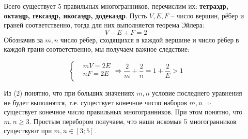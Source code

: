 \documentclass[12pt]{article}
\newcommand{\te}{\ensuremath{\Rightarrow}}
\begin{document}
Всего существует 5 правильных многогранников, перечислим их: \textbf{тетраэдр, октаэдр, гексаэдр, икосаэдр, додекаэдр}. Пусть $ V, E, F $ -- число вершин, рёбер и граней соответственно, тогда для них выполняется теорема Эйлера: 
 \begin{equation}
V - E + F = 2
 \end{equation}
Обозначив за $m,n$  число рёбер, сходящихся в каждой вершине и  число рёбер в каждой грани соответственно, мы получаем важное следствие: 

\begin{equation}
\left\{
\begin{aligned}
&mV= 2E  \\
&nF = 2E\\
\end{aligned}
\right.
\te \dfrac{2}{m} + \dfrac{2}{n} = 1 + \dfrac{2}{E} > 1
\end{equation}

Из (2) понятно, что при больших значениях $m, n$ условие последнего уравнения не будет выполнятся, т.е. существует конечное число наборов $m, n \te $ существует конечное число правильных многогранников. При этом понятно, что $m, n \geqslant 3$.  Простым перебором получаем, что наши искомые 5 многогранников существуют при $ m, n  \in [3;5]$. 
\end{document}
